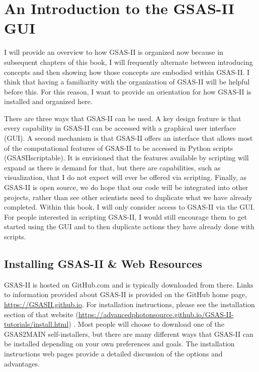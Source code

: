 \chapter{An Introduction to the GSAS-II GUI}
\label{Chap:GSASIIintro}

 I will provide an overview to how GSAS-II is organized now because in subsequent chapters of this book, I will frequently alternate between introducing concepts and then showing how those concepts are embodied within GSAS-II. I think that having a familiarity with the organization of GSAS-II will be helpful before this. For this reason, I want to provide an orientation for how GSAS-II is installed and organized here.

 There are three ways that GSAS-II can be used. A key design feature is that every capability in GSAS-II can be accessed with a graphical user interface (GUI). A second mechanism is that GSAS-II offers an interface that allows most of the computational features of GSAS-II to be accessed in Python scripts  (GSASIIscriptable). It is envisioned that the features available by scripting will expand as there is demand for that, but there are capabilities, such as visualization, that I do not expect will ever be offered via scripting. Finally, as GSAS-II is open source, we do hope that our code will be integrated into other projects, rather than see other scientists need to duplicate what we have already completed. Within this book, I will only consider access to GSAS-II via the GUI. For people interested in scripting GSAS-II, I would still encourage them to get started using the GUI and to then duplicate actions they have already done with scripts. 

\section{Installing GSAS-II \& Web Resources}
GSAS-II is hosted on GitHub.com and is typically downloaded from there. Links to information provided about GSAS-II is provided on the GitHub home page, \url{https://GSASII.github.io}. For installation instructions, please see the installation section of that website (\url{https://advancedphotonsource.github.io/GSAS-II-tutorials/install.html}) . Most people will choose to download one of the GSAS2MAIN self-installers, but there are many different ways that GSAS-II can be installed depending on your own preferences and goals. The installation instructions web pages provide a detailed  discussion of the options and advantages. 

